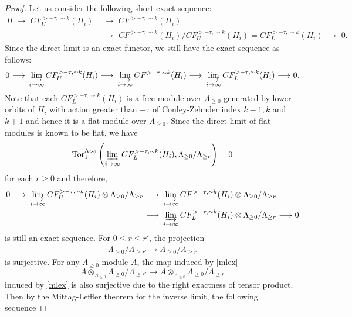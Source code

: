 \documentclass[12pt]{amsart}
\theoremstyle{definition}
\newcommand{\ton}{{\otimes_{\Lambda_{\geq 0}}}}
\newcommand{\lr}{{\,\,\longrightarrow\,\,}}
\begin{document}
\begin{proof}

\vspace{0.2 cm}

    Let us consider the following short exact sequence:
    \begin{align*}
        0 \lr CF^{>-\tau,\sim k}_{U}(H_i) &\lr CF^{>-\tau,\sim k}(H_i)\\& \lr CF^{>-\tau,\sim k}(H_i)/CF^{>-\tau,\sim k}_{U}(H_i) = CF^{>-\tau,\sim k}_{L}(H_i) \lr 0.
    \end{align*}
Since the direct limit is an exact functor, we still have the exact sequence as follows:
\begin{align*}
    0 \lr \varinjlim_{i \to \infty}CF^{>-\tau,\sim k}_{U}(H_i) \lr \varinjlim_{i \to \infty}CF^{>-\tau,\sim k}(H_i) \lr \varinjlim_{i \to \infty}CF^{>-\tau,\sim k}_{L}(H_i) \lr 0.
\end{align*}
Note that each $CF^{>-\tau,\sim k}_{L}(H_i)$ is a free module over $\Lambda_{\geq 0}$ generated by lower orbits of $H_i$ with action greater than $-\tau$ of Conley-Zehnder index $k-1,k$ and $k+1$ and hence it is a flat module over $\Lambda_{\geq0}$. Since the direct limit of flat modules is known to be flat, we have
\begin{align*}
    \text{Tor}_1^{\Lambda_{\geq 0}}\left(\varinjlim_{i \to \infty}CF^{>-\tau,\sim k}_{L}(H_i), \Lambda_{\geq 0}/ \Lambda_{\geq r}\right) = 0
\end{align*}
for each $r \geq 0$ and therefore,
\begin{align*}
    0 \lr  \varinjlim_{i \to \infty}CF^{>-\tau,\sim k}_{U}(H_i) \otimes \Lambda_{\geq 0}/\Lambda_{\geq r} & \lr \varinjlim_{i \to \infty}CF^{>-\tau,\sim k}(H_i) \otimes \Lambda_{\geq 0}/\Lambda_{\geq r}\\ & \lr \varinjlim_{i \to \infty}CF^{>-\tau,\sim k}_{L}(H_i)\otimes \Lambda_{\geq 0}/\Lambda_{\geq r} \lr 0
\end{align*}
is still an exact sequence. For $0 \leq r \leq r'$, the projection
\begin{align}\label{mlex}
    \Lambda_{\geq 0}/ \Lambda_{\geq r'} \to \Lambda_{\geq 0}/ \Lambda_{\geq r}
\end{align}
is surjective. For any $\Lambda_{\geq 0}$-module $A$, the map induced by \eqref{mlex} $$A \ton \Lambda_{\geq 0}/ \Lambda_{\geq r'} \to A \ton \Lambda_{\geq 0}/ \Lambda_{\geq r}$$ induced by \eqref{mlex} is also surjective due to the right exactness of tensor product. Then by the Mittag-Leffler theorem for the inverse limit, the following sequence

\end{proof}
\end{document}

